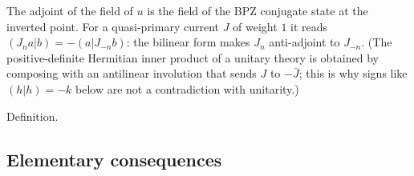 \begin{physics}
The adjoint of the field of $u$ is the field of the BPZ conjugate state at the inverted point. For a
quasi-primary current $J$ of weight $1$ it reads $(J_na|b) = -(a|J_{-n}b)$: the bilinear form makes $J_n$
anti-adjoint to $J_{-n}$. (The positive-definite Hermitian inner product of a unitary theory is obtained
by composing with an antilinear involution that sends $J$ to $-\bar J$; this is why signs like
$(h|h) = -k$ below are not a contradiction with unitarity.)
\end{physics}
\begin{status}
Definition.
\end{status}

\subsection{Elementary consequences}

